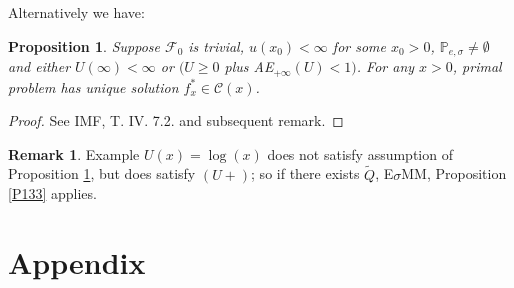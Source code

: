 \documentclass[12pt,a4paper, twoside]{article}
\newtheorem{prop}{Proposition}[section]
\theoremstyle{definition}
\newtheorem{rem}{Remark}[section]
\newcommand{\PP}{\mathbb{P}} %
\begin{document}
Alternatively we have:
\begin{prop} \label{P134} Suppose $\mathcal{F}_0$ is trivial,  $u(x_0) < \infty$ for some $x_0 >0$, $ \PP_{e,  \sigma} \neq \emptyset$ and either $U( \infty) < \infty$ or $(U \geq 0$ plus AE$_{+ \infty}(U) < 1)$. For any $x >0$, primal problem has unique solution $f_x^* \in \mathcal{C}(x)$.
\end{prop}
\begin{proof}
See IMF, T. IV. 7.2. and subsequent remark.
\end{proof}
\begin{rem} Example $U(x)= \log(x)$ does not satisfy assumption of Proposition \ref{P134},  but does satisfy $(U+)$; so if there exists $\widetilde{Q}$, E$\sigma$MM, Proposition \ref{P133} applies. 
\end{rem}
\newpage
\section{Appendix}
\end{document}
